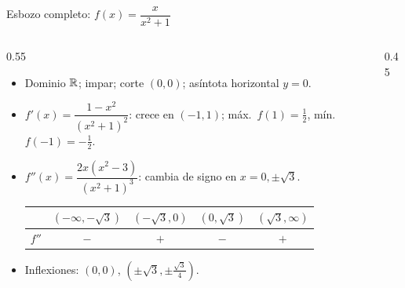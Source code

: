 \documentclass[10pt,aspectratio=169]{beamer}
\begin{document}
\begin{frame}{Esbozo completo: $f(x)=\dfrac{x}{x^2+1}$}
  \begin{columns}
    \begin{column}{0.55\textwidth}
      \begin{itemize}
        \item Dominio $\mathbb{R}$; impar; corte $(0,0)$; asíntota horizontal $y=0$.
        \item $f'(x)=\dfrac{1-x^2}{(x^2+1)^2}$: crece en $(-1,1)$; máx.\ $f(1)=\frac12$, mín.\ $f(-1)=-\frac12$.
        \item $f''(x)=\dfrac{2x(x^2-3)}{(x^2+1)^3}$: cambia de signo en $x=0,\pm\sqrt3$.
          \begin{center}
            \small
            \begin{tabular}{c|cccc}
              & $(-\infty,-\sqrt3)$ & $(-\sqrt3,0)$ & $(0,\sqrt3)$ & $(\sqrt3,\infty)$\\ \hline
              $f''$ & $-$ & $+$ & $-$ & $+$
            \end{tabular}
          \end{center}
        \item Inflexiones: $(0,0)$, $\left(\pm\sqrt3,\pm\frac{\sqrt3}{4}\right)$.
      \end{itemize}
    \end{column}
    \begin{column}{0.45\textwidth}
      \centering
    \end{column}
  \end{columns}
\end{frame}
\end{document}
